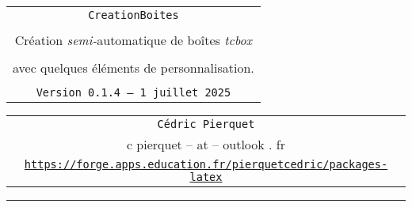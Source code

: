 \documentclass[french,11pt,a4paper]{article}
\def\TPversion{0.1.4}
\def\TPdate{1\up*{er} juillet 2025}
\begin{document}
\pagestyle{fancy}

\thispagestyle{empty}

\begin{center}
	\begin{minipage}{0.88\linewidth}
	\begin{tcolorbox}[colframe=yellow,colback=yellow!15]
		\begin{center}
			\begin{tabular}{c}
				{\Huge \texttt{CreationBoites}}\\
				\\
				{\LARGE Création \textit{semi-}automatique de boîtes \textit{tcbox}} \\
				\\
				{\LARGE avec quelques éléments de personnalisation.} \\
				\\
				{\small \texttt{Version \TPversion{} -- \TPdate}}
		\end{tabular}
		\end{center}
	\end{tcolorbox}
\end{minipage}
\end{center}

\begin{center}
	\begin{tabular}{c}
	\texttt{Cédric Pierquet}\\
	{\ttfamily c pierquet -- at -- outlook . fr}\\
	\texttt{\url{https://forge.apps.education.fr/pierquetcedric/packages-latex}}
\end{tabular}
\end{center}

\hrule

\vfill
\end{document}
